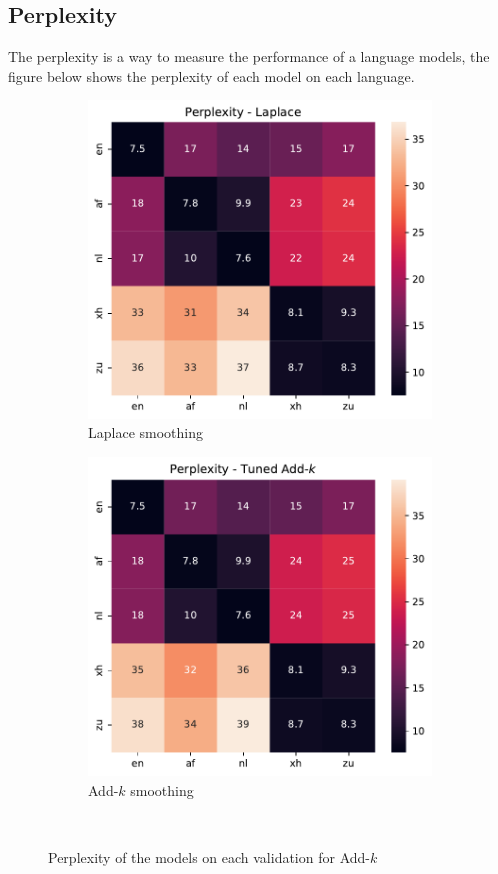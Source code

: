 \subsection{Perplexity}
The perplexity is a way to measure the performance of a language models, the figure below shows the perplexity of each model on each language.
\begin{figure}[H]
    \centering
    \begin{subfigure}[t]{0.5\linewidth}
        \centering
        \includegraphics[width=\linewidth]{./figures/laplace.pdf}
        \caption{Laplace smoothing}
    \end{subfigure}%
    \begin{subfigure}[t]{0.5\linewidth}
        \centering
        \includegraphics[width=\linewidth]{./figures/add_k.pdf}
        \caption{Add-$k$ smoothing}
    \end{subfigure}\\
    \caption{Perplexity of the models on each validation for Add-$k$}
    \label{fig:add-k}
\end{figure}
